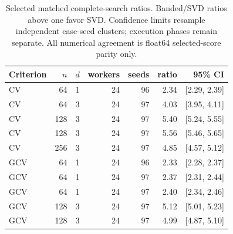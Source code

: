 \newcommand{\EmpiricalJobs}{2813}
\newcommand{\EmpiricalRows}{92679}
\newcommand{\EmpiricalValidRows}{76220}
\newcommand{\EmpiricalFailedJobs}{57}
\begin{table}[t]
\caption{Selected matched complete-search ratios. Banded/SVD ratios above one favor SVD. Confidence limits resample independent case-seed clusters; execution phases remain separate. All numerical agreement is float64 selected-score parity only.}
\label{tab:empirical-paired}
\centering\small
\begin{tabular}{lrrrrrr}
\toprule
Criterion & $n$ & $d$ & workers & seeds & ratio & 95\% CI\\
\midrule
CV & 64 & 1 & 24 & 96 & 2.34 & [2.29, 2.39]\\
CV & 64 & 3 & 24 & 97 & 4.03 & [3.95, 4.11]\\
CV & 128 & 3 & 24 & 97 & 5.40 & [5.24, 5.55]\\
CV & 128 & 3 & 24 & 97 & 5.56 & [5.46, 5.65]\\
CV & 256 & 3 & 24 & 97 & 4.85 & [4.57, 5.12]\\
GCV & 64 & 1 & 24 & 96 & 2.33 & [2.28, 2.37]\\
GCV & 64 & 1 & 24 & 97 & 2.37 & [2.31, 2.44]\\
GCV & 64 & 1 & 24 & 97 & 2.40 & [2.34, 2.46]\\
GCV & 128 & 3 & 24 & 97 & 5.12 & [5.01, 5.23]\\
GCV & 128 & 3 & 24 & 97 & 4.99 & [4.87, 5.10]\\
\bottomrule
\end{tabular}
\end{table}
